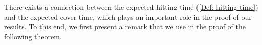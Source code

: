 \documentclass[11pt, reqno]{amsart}
\theoremstyle{plain}%
\theoremstyle{definition}
\theoremstyle{definition}
\def\N{\ensuremath{\mathbb N}}
\def\U{\ensuremath{\mathcal U}}
\def\st{such that }
\numberwithin{equation}{section}
\begin{document}


















There exists a connection between the expected hitting time (\ref{Def: hitting time}) and the expected cover time, which plays an important role in the proof of our results. To this end, we first present a remark that we use in the proof of the following theorem.
\end{document}
